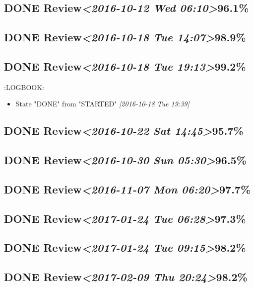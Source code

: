 \documentclass[11pt]{ctexart}
\begin{document}
\subsection{{\bfseries\sffamily DONE} Review\textit{<2016-10-12 Wed 06:10>}96.1\%}
\label{sec:org190c33f}
\subsection{{\bfseries\sffamily DONE} Review\textit{<2016-10-18 Tue 14:07>}98.9\%}
\label{sec:orgdf5283f}
\subsection{{\bfseries\sffamily DONE} Review\textit{<2016-10-18 Tue 19:13>}99.2\%}
\label{sec:org378213b}
:LOGBOOK:
\begin{itemize}
\item State "DONE"       from "STARTED"    \textit{[2016-10-18 Tue 19:39]}
\end{itemize}
\subsection{{\bfseries\sffamily DONE} Review\textit{<2016-10-22 Sat 14:45>}95.7\%}
\label{sec:org50a1076}
\subsection{{\bfseries\sffamily DONE} Review\textit{<2016-10-30 Sun 05:30>}96.5\%}
\label{sec:org4acba7b}
\subsection{{\bfseries\sffamily DONE} Review\textit{<2016-11-07 Mon 06:20>}97.7\%}
\label{sec:orgac5d604}
\subsection{{\bfseries\sffamily DONE} Review\textit{<2017-01-24 Tue 06:28>}97.3\%}
\label{sec:org02db92c}
\subsection{{\bfseries\sffamily DONE} Review\textit{<2017-01-24 Tue 09:15>}98.2\%}
\label{sec:org787c9b7}
\subsection{{\bfseries\sffamily DONE} Review\textit{<2017-02-09 Thu 20:24>}98.2\%}
\label{sec:org06952b5}
\end{document}
